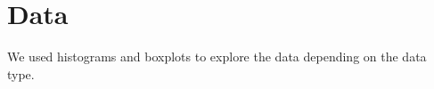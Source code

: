 \section{Data}





We used histograms and boxplots to explore the data depending on the data type.




